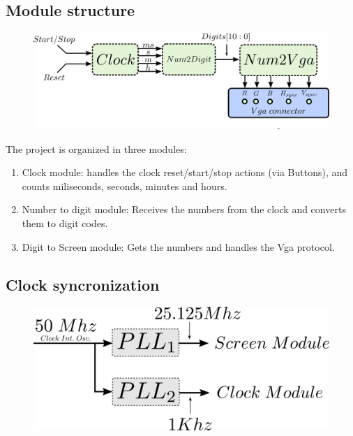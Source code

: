 \newpage



\subsection*{Module structure}
\begin{figure}[htbp]
    \begin{center}
    \includegraphics[scale=0.8]{dibujos/estructura.png}
    
    \end{center}
    
    \label{fig:Estructura}
    \end{figure}

The project is organized in three modules:
\begin{enumerate}
\item Clock module: handles the clock reset/start/stop actions (via Buttons), and counts miliseconds, seconds, minutes and hours.
\item Number to digit module: Receives the numbers from the clock and converts them to digit codes.
\item Digit to Screen module: Gets the numbers and handles the Vga protocol. 
\end{enumerate}


\subsection*{Clock syncronization}
\begin{figure}[htbp]
    \begin{center}
    \includegraphics[scale=0.8]{dibujos/pll.png}
    
    \end{center}
    
    \label{fig:ClockSync}
    \end{figure}

